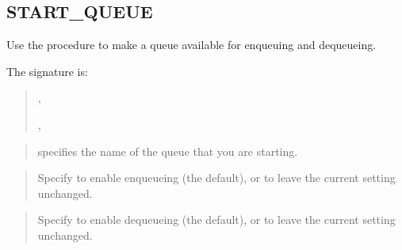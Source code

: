 \documentclass[letterpaper,10pt,english,openany,oneside]{sphinxmanual}
\begin{document}
\newpage


\subsection{START\_QUEUE}
\label{\detokenize{start_queue::doc}}\label{\detokenize{start_queue:start-queue}}
Use the  procedure to make a queue available for enqueuing
and dequeueing.

The signature is:
\begin{quote}

\begin{DUlineblock}{0em}
\item[] 
\item[]
\begin{DUlineblock}{\DUlineblockindent}
\item[] ,
\item[] ,
\item[] 
\end{DUlineblock}
\end{DUlineblock}
\end{quote}


\begin{quote}

 specifies the name of the queue that you are starting.
\end{quote}

\begin{quote}

Specify  to enable enqueueing (the default), or  to leave
the current setting unchanged.
\end{quote}

\begin{quote}

Specify  to enable dequeueing (the default), or  to leave
the current setting unchanged.
\end{quote}

\end{document}
